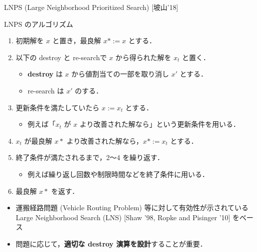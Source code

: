 \documentclass[11pt,dvipdfmx]{beamer}
\begin{document}
\begin{frame}{LNPS (Large Neighborhood Prioritized Search) [坡山'18]}
  \begin{block}{\small LNPS のアルゴリズム}
    \begin{enumerate}
      \compress
      \item 初期解を $x$ と置き，最良解 $x* := x$ とする．
      \item 以下の destroy と re-searchで $x$ から得られた解を $x_t$ と置く．
      \begin{itemize}
        \compress
        \item \alert{\bf destroy} は $x$ から値割当ての一部を取り消し $x'$ とする．
        \item re-search は $x'$ のする．
      \end{itemize}
      \item 更新条件を満たしていたら $x := x_t$ とする．
      \begin{itemize}
        \item 例えば「$x_t$ が $x$ より改善された解なら」という更新条件を用いる．
      \end{itemize}
      \item $x_t$ が最良解 $x*$ より改善された解なら，$x* := x_t$ とする．
      \item 終了条件が満たされるまで，2〜4 を繰り返す．
      \begin{itemize}
        \item 例えば繰り返し回数や制限時間などを終了条件に用いる．
      \end{itemize}
      \item 最良解 $x*$ を返す．
    \end{enumerate}
  \end{block}

  \begin{itemize}
  \item 運搬経路問題 (Vehicle Routing Problem)
    等に対して有効性が示されている
    Large Neighborhood Search (LNS) [Shaw '98, Ropke and Pisinger '10]
    をベース
  \item 問題に応じて，\alert{\bf 適切な destroy 演算を設計}することが重要．
  \end{itemize}
\end{frame}
\end{document}
